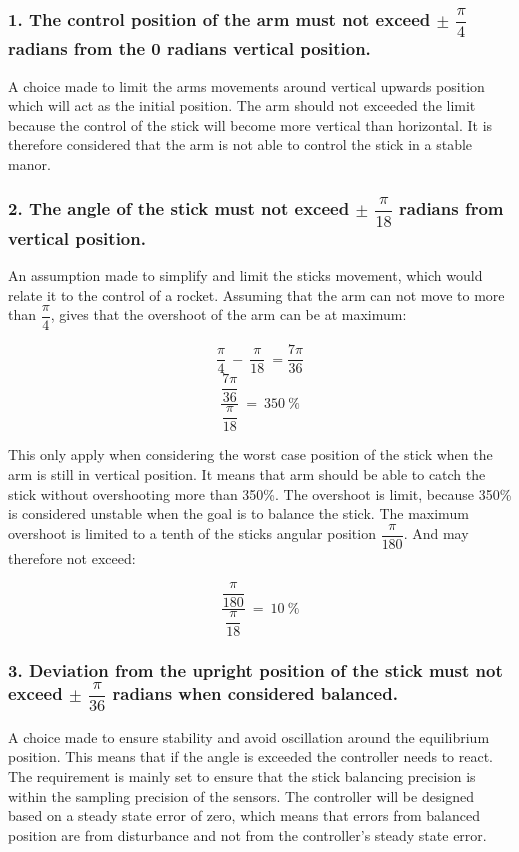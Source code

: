 \subsubsection*{1. The control position of the arm must not exceed $\pm$ $\dfrac{\pi}{4}$ radians from the 0 radians vertical position.} 
\forceindent A choice made to limit the arms movements around vertical upwards position which will act as the initial position. The arm should not exceeded the limit because the control of the stick will become more vertical than horizontal. It is therefore considered that the arm is not able to control the stick in a stable manor.  


\subsubsection*{2. The angle of the stick must not exceed $\pm$ $\dfrac{\pi}{18}$ radians from vertical position.}
\forceindent An assumption made to simplify and limit the sticks movement, which would relate it to the control of a rocket. Assuming that the arm can not move to more than $\dfrac{\pi}{4}$, gives that the overshoot of the arm can be at maximum:


\begin{equation}
\dfrac{\pi}{4}\ -\ \dfrac{\pi}{18}\ = \dfrac{7\pi}{36}
\end{equation}
\begin{equation}
\frac{\dfrac{7\pi}{36}}{\dfrac{\pi}{18}}\ =\ 350\ \% 
\end{equation}

This only apply when considering the worst case position of the stick when the arm is still in vertical position. It means that arm should be able to catch the stick without overshooting more than 350\%. The overshoot is limit, because 350\% is considered unstable when the goal is to balance the stick. The maximum overshoot is limited to a tenth of the sticks angular position $\dfrac{\pi}{180}$. And may therefore not exceed:

\begin{equation}
\frac{\dfrac{\pi}{180}}{\dfrac{\pi}{18}}\ =\ 10\ \% 
\end{equation}


\subsubsection*{3. Deviation from the upright position of the stick must not exceed $\pm$ $\dfrac{\pi}{36}$ radians when considered balanced.}
\forceindent A choice made to ensure stability and avoid oscillation around the equilibrium position.
This means that if the angle is exceeded the controller needs to react. The requirement is mainly set to ensure that the stick balancing precision is within the sampling precision of the sensors. The controller will be designed based on a steady state error of zero, which means that errors from balanced position are from disturbance and not from the controller's steady state error.

